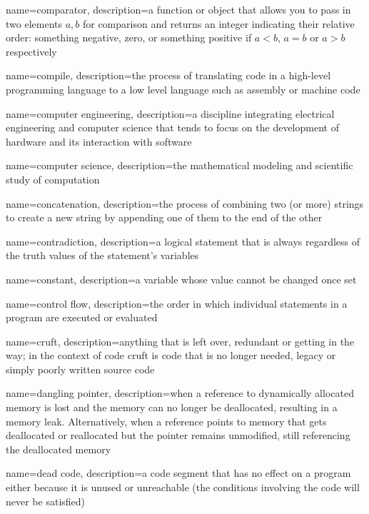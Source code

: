 {
  name=comparator,
  description={a function or object that allows you to pass in two elements $a, b$ for comparison and returns an integer indicating their relative order: something negative, zero, or something positive if $a < b$, $a = b$ or $a > b$ respectively}
}

{
  name=compile,
  description={the process of translating code in a high-level programming language to a low level language such as assembly or machine code}
}

{
  name=computer engineering,
  description={a discipline integrating electrical engineering and computer science that tends to focus on the development of hardware and its interaction with software}
}

{
  name=computer science,
  description={the mathematical modeling and scientific study of computation}
}

{
  name=concatenation,
  description={the process of combining two (or more) strings to create a new string by appending one of them to the end of the other}
}

{
  name=contradiction,
  description={a logical statement that is always \False regardless of the truth values of the statement's variables}
}

{
  name=constant,
  description={a variable whose value cannot be changed once set}
}

{
  name=control flow,
  description={the order in which individual statements in a program are executed or evaluated}
}

{
  name=cruft,
  description={anything that is left over, redundant or getting in the way; in the context of code cruft is code that is no longer needed, legacy or simply poorly written source code}
}

{
  name=dangling pointer,
  description={when a reference to dynamically allocated memory is lost and the memory can no longer be deallocated, resulting in a memory leak.  Alternatively, when a reference points to memory that gets deallocated or reallocated but the pointer remains unmodified, still referencing the deallocated memory}
}

{
  name=dead code,
  description={a code segment that has no effect on a program either because it is unused or unreachable (the 
	conditions involving the code will never be satisfied)}
}

